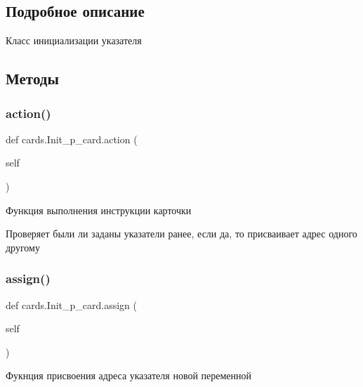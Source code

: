 \subsection{Подробное описание}
Класс инициализации указателя 



\subsection{Методы}
\mbox{\label{classcards_1_1_init__p__card_a6e43a1cc4adb95f873317aa142d62c8f}} 
\subsubsection{\texorpdfstring{action()}{action()}}
{\footnotesize\ttfamily def cards.\+Init\+\_\+p\+\_\+card.\+action (\begin{DoxyParamCaption}\item[{}]{self }\end{DoxyParamCaption})}



Функция выполнения инструкции карточки 

Проверяет были ли заданы указатели ранее, если да, то присваивает адрес одного другому \mbox{\label{classcards_1_1_init__p__card_aca8213c8c2c55dfb4082e2466c6cb5cc}} 
\subsubsection{\texorpdfstring{assign()}{assign()}}
{\footnotesize\ttfamily def cards.\+Init\+\_\+p\+\_\+card.\+assign (\begin{DoxyParamCaption}\item[{}]{self }\end{DoxyParamCaption})}



Фукнция присвоения адреса указателя новой переменной 

\mbox{\label{classcards_1_1_init__p__card_afe86b403a86c886227ae29fa01f2947a}} 
